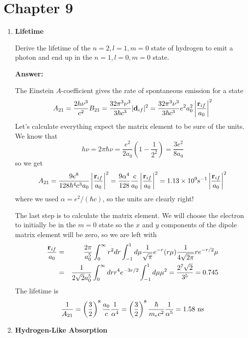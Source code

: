 \documentclass{article}
\newcommand{\rmmat}[1]{\hbox{\rm #1}}
\begin{document}
\fi

\section{Chapter 9} 
\begin{enumerate}
\item{\bf Lifetime}

Derive the lifetime of the $n=2, l=1, m=0$ state of hydrogen to emit a
photon and end up in the $n=1, l=0, m=0$ state.

{\bf Answer:}

The Einstein $A$-coefficient gives the rate of spontaneous emission
for a state
\begin{equation}
A_{21} = \frac{2h\nu^3}{c^2} B_{21} = \frac{32 \pi^3 \nu^3}{3 \hbar
  c^3} |{\bf d}_{if}|^2  = \frac{32 \pi^3 \nu^3}{3 \hbar
  c^3} e^2 a_0^2 \left |\frac{{\bf r}_{if}}{a_0} \right |^2 
\end{equation}
Let's calculate everything expect the matrix element to be sure of the
units.   We know that
\begin{equation}
h\nu = 2\pi \hbar \nu = \frac{e^2}{2 a_0} \left ( 1 - \frac{1}{2^2} \right ) = \frac{3
  e^2}{8 a_0}
\end{equation}
so we get
\begin{equation}
A_{21} = \frac{9 e^8}{128 \hbar^4 c^3 a_0}  \left |\frac{{\bf
    r}_{if}}{a_0} \right |^2  = \frac{9 \alpha^4}{128} \frac{c}{a_0} \left |\frac{{\bf
    r}_{if}}{a_0} \right |^2 = 1.13 \times 10^9 \rmmat{s}^{-1} \left |\frac{{\bf
    r}_{if}}{a_0} \right |^2
\end{equation}
where we used $\alpha=e^2/(\hbar c)$, so the units are clearly right!

The last step is to calculate the matrix element.  We will choose the
electron to initially be in the $m=0$ state so the $x$ and $y$
components of the dipole matrix element will be zero, so we are left with
\begin{eqnarray}
\frac{{\bf r}_{if}}{a_0} &=&  
\frac{2\pi}{a_0^5} \int_0^\infty r^2 dr \int_{-1}^1 d\mu \frac{1}{\sqrt{\pi}} e^{-r} (r\mu)
\frac{1}{4\sqrt{2\pi}} r e^{-r/2} \mu \\
&=& \frac{1}{2 \sqrt{2} a_0^5} \int_0^\infty dr  r^4 e^{-3r/2}
\int_{-1}^1 d\mu  \mu^2 = \frac{2^7\sqrt{2}}{3^5} = 0.745\\
\end{eqnarray}
The lifetime is
\begin{equation}
\frac{1}{A_{21}} = \left ( \frac{3}{2} \right )^8  \frac{a_0}{c}
\frac{1}{\alpha^4} =  \left ( \frac{3}{2} \right )^8  \frac{\hbar}{m_e
  c^2} \frac{1}{\alpha^5} = 1.58~\rmmat{ns}
\end{equation}
\item{\bf Hydrogen-Like Absorption}


\end{enumerate}
\end{document}
